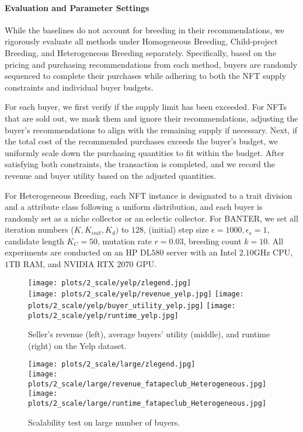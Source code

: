 \documentclass[conference]{IEEEtran}
\newcommand{\1}[1]{\mathds{1}\left[#1\right]}
\theoremstyle{plain}
\newcommand{\method}{\textsf{BANTER}\xspace}
\newcommand{\homob}{Homogeneous Breeding\xspace}
\newcommand{\heterb}{Heterogeneous Breeding\xspace}
\newcommand{\childb}{Child-project Breeding\xspace}
\begin{document}
{\paragraph{Evaluation and Parameter Settings}
While the baselines do not account for breeding in their recommendations, we rigorously evaluate all methods under \homob, \childb, and \heterb separately. Specifically, based on the pricing and purchasing recommendations from each method, buyers are randomly sequenced to complete their purchases while adhering to both the NFT supply constraints and individual buyer budgets.

For each buyer, we first verify if the supply limit has been exceeded. For NFTs that are sold out, we mask them and ignore their recommendations, adjusting the buyer’s recommendations to align with the remaining supply if necessary. Next, if the total cost of the recommended purchases exceeds the buyer’s budget, we uniformly scale down the purchasing quantities to fit within the budget. After satisfying both constraints, the transaction is completed, and we record the revenue and buyer utility based on the adjusted quantities.

For \heterb, each NFT instance is designated to a trait division and a attribute class following a uniform distribution, and each buyer is randomly set as a niche collector or an eclectic collector. For \method, we set all iteration numbers ($K, K_{init}, K_{d})$ to $128$, (initial) step size $\epsilon=1000, \epsilon_s=1$, candidate length $K_C=50$, mutation rate $r=0.03$, breeding count $k=10$. All experiments are conducted on an HP DL$580$ server with an Intel $2.10$GHz CPU, $1$TB RAM, and NVIDIA RTX $2070$ GPU.
}

\begin{figure*}[t!]
    \centering
    \begin{minipage}[t]{.48\textwidth}
    \centering
    \texttt{[image: plots/2\_scale/yelp/zlegend.jpg]}\\
    \texttt{[image: plots/2\_scale/yelp/revenue\_yelp.jpg]}
    \texttt{[image: plots/2\_scale/yelp/buyer\_utility\_yelp.jpg]}
    \texttt{[image: plots/2\_scale/yelp/runtime\_yelp.jpg]}
    \caption{Seller's revenue (left), average buyers' utility (middle), and runtime (right) on the Yelp dataset.}
    \label{fig:yelp-results}
\end{minipage}
    \hfill
    \begin{minipage}[t]{.48\textwidth}
    \centering
    \texttt{[image: plots/2\_scale/large/zlegend.jpg]}\\
    \hfill
    \texttt{[image: plots/2\_scale/large/revenue\_fatapeclub\_Heterogeneous.jpg]}
    \quad
    \texttt{[image: plots/2\_scale/large/runtime\_fatapeclub\_Heterogeneous.jpg]}
    \hfill
    \vspace{-2mm}
    \caption{Scalability test on large number of buyers.}
    \label{fig:scale}
\end{minipage}
    \vspace{-2mm}
\end{figure*}
\end{document}
